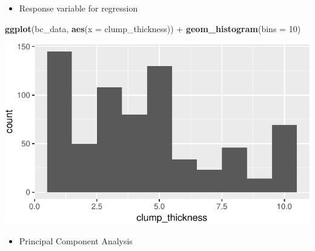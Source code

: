\documentclass[]{article}
\newenvironment{Shaded}{\begin{snugshade}}{\end{snugshade}}
\newcommand{\KeywordTok}[1]{\textcolor[rgb]{0.13,0.29,0.53}{\textbf{{#1}}}}
\newcommand{\DataTypeTok}[1]{\textcolor[rgb]{0.13,0.29,0.53}{{#1}}}
\newcommand{\DecValTok}[1]{\textcolor[rgb]{0.00,0.00,0.81}{{#1}}}
\newcommand{\StringTok}[1]{\textcolor[rgb]{0.31,0.60,0.02}{{#1}}}
\newcommand{\NormalTok}[1]{{#1}}
\providecommand{\tightlist}{%
  \setlength{\itemsep}{0pt}\setlength{\parskip}{0pt}}
\begin{document}
\begin{itemize}
\tightlist
\item
  Response variable for regression
\end{itemize}

\begin{Shaded}
\begin{Highlighting}[]
\KeywordTok{ggplot}\NormalTok{(bc_data, }\KeywordTok{aes}\NormalTok{(}\DataTypeTok{x =} \NormalTok{clump_thickness)) +}
\StringTok{  }\KeywordTok{geom_histogram}\NormalTok{(}\DataTypeTok{bins =} \DecValTok{10}\NormalTok{)}
\end{Highlighting}
\end{Shaded}

\includegraphics{webinar_code_files/figure-latex/response_regression-1.pdf}

\begin{itemize}
\tightlist
\item
  Principal Component Analysis
\end{itemize}
\end{document}
